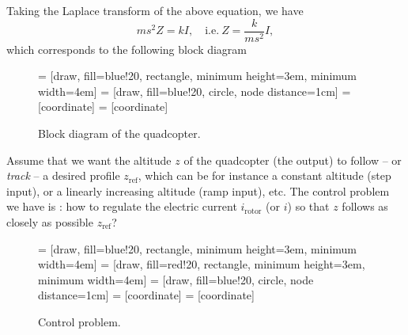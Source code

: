 \documentclass[a4paper,11pt]{report}
\theoremstyle{definition}
\newcommand{\re}{\mathrm{ref}}
\begin{document}
Taking the Laplace transform of the above equation, we have
\[
ms^2 Z = k I,\quad \textrm{i.e.}\ Z=\frac{k}{ms^2} I,
\]
which corresponds to the following block diagram

\begin{figure}[H]
  \label{fig:examplesystem}
  \centering
   = [draw, fill=blue!20, rectangle, minimum height=3em, minimum width=4em]
   = [draw, fill=blue!20, circle, node distance=1cm]
   = [coordinate]
   = [coordinate]
  \caption{Block diagram of the quadcopter.}
\end{figure}

Assume that we want the altitude $z$ of the quadcopter (the output) to
follow -- or \emph{track} -- a desired profile $z_\re$, which can be
for instance a constant altitude (step input), or a linearly
increasing altitude (ramp input), etc. The control problem we have is
: how to regulate the electric current $i_\textrm{rotor}$ (or $i$) so
that $z$ follows as closely as possible $z_\re$?

\begin{figure}[H]
  \label{fig:examplesystemp}
  \centering
   = [draw, fill=blue!20, rectangle, minimum height=3em, minimum width=4em]
   = [draw, fill=red!20, rectangle, minimum height=3em, minimum width=4em]
   = [draw, fill=blue!20, circle, node distance=1cm]
   = [coordinate]
   = [coordinate]
  \caption{Control problem.}
\end{figure}
\end{document}
